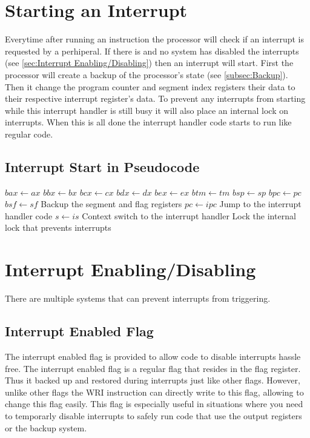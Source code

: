 \documentclass[oneside, a4paper]{memoir}
\begin{document}
\section{Starting an Interrupt}
Everytime after running an instruction the processor will check if an interrupt is requested by a perhiperal. If there is and no system has disabled the interrupts (see \autoref{sec:Interrupt Enabling/Disabling}) then an interrupt will start. First the processor will create a backup of the processor's state (see \autoref{subsec:Backup}). Then it change the program counter and segment index registers their data to their respective interrupt register's data. To prevent any interrupts from starting while this interrupt handler is still busy it will also place an internal lock on interrupts. When this is all done the interrupt handler code starts to run like regular code.
\subsection{Interrupt Start in Pseudocode}
\begin{algorithmic}
\State {}
\State $bax \gets ax$
\State $bbx \gets bx$
\State $bcx \gets cx$
\State $bdx \gets dx$
\State $bex \gets ex$
\State $btm \gets tm$
\State $bsp \gets sp$
\State $bpc \gets pc$
\State $bsf \gets sf$ \Comment Backup the segment and flag registers
\State $pc \gets ipc$ \Comment Jump to the interrupt handler code
\State $s \gets is$ \Comment Context switch to the interrupt handler
\State {} \Comment Lock the internal lock that prevents interrupts
\EndIf
\State {}
\end{algorithmic}

\section{Interrupt Enabling/Disabling}
\label{sec:Interrupt Enabling/Disabling}
There are multiple systems that can prevent interrupts from triggering.
\subsection{Interrupt Enabled Flag}
The interrupt enabled flag is provided to allow code to disable interrupts hassle free. The interrupt enabled flag is a regular flag that resides in the flag register. Thus it backed up and restored during interrupts just like other flags. However, unlike other flags the WRI instruction can directly write to this flag, allowing to change this flag easily. This flag is especially useful in situations where you need to temporarly disable interrupts to safely run code that use the output registers or the backup system.
\end{document}
